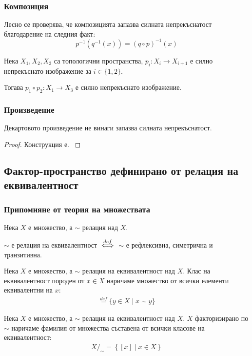 \subsubsection{Композиция}
Лесно се проверява, че композицията запазва силната непрекъснатост благодарение на следния факт:
\begin{equation}
    p^{-1}(q^{-1}(x)) = (q \circ p)^{-1}(x)
\end{equation}
\begin{proposition}
    Нека $X_1, X_2, X_3$ са топологични пространства, $p_i: X_i \to X_{i+1}$ е силно непрекъснато изображение за $i \in \{1, 2\}$.

    Тогава $p_1 \circ p_2 : X_1 \to X_3$ е силно непрекъснато изображение.
\end{proposition}

\subsubsection{Произведение}
Декартовото произведение не винаги запазва силната непрекъснатост.
\begin{proof}
    Конструкция е.
    \cite[стр.~143]{munkrestopology}
\end{proof}

\subsection{Фактор-пространство дефинирано от релация на еквивалентност}
\subsubsection{Припомняне от теория на множествата}
\begin{definition}
    Нека $X$ е множество, а $\sim$ релация над $X$.

    $\sim$ е релация на еквивалентност ${\overset{def}{\iff}}$ $\sim$ е рефлексивна, симетрична и транзитивна.
\end{definition}
\begin{definition}
    Нека $X$ е множество, а $\sim$ релация на еквивалентност над $X$. Клас на еквивалентност породен от $x \in X$ наричаме множество от всички елементи еквивалентни на $x$:
    \begin{eqnarray}
        [x] \overset{def}{=} \{y \in X \mid x \sim y \}
    \end{eqnarray}
\end{definition}

\begin{definition}
    Нека $X$ е множество, а $\sim$ релация на еквивалентност над $X$. $X$ факторизирано по $\sim$ наричаме фамилия от множества съставена от всички класове на еквивалентност:
    \begin{eqnarray}
        X/_\sim = \left\{[x] \mid x \in X\right\}
    \end{eqnarray}
\end{definition}

